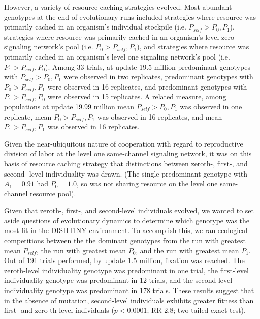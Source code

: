 However, a variety of resource-caching strategies evolved.
Most-abundant genotypes at the end of evolutionary runs included strategies where resource was primarily cached in an organism's individual stockpile (i.e. $P_{self} > P_0, P_1$), strategies where resource was primarily cached in an organism's level zero signaling network's pool (i.e. $P_0 > P_{self}, P_1$), and strategies where resource was primarily cached in an organism's level one signaling network's pool (i.e. $P_1 > P_{self}, P_0$).
Among 33 trials, at update 19.5 million predominant genotypes with $P_{self} > P_0, P_1$ were observed in two replicates, predominant genotypes with $P_0 > P_{self}, P_1$ were observed in 16 replicates, and predominant genotypes with $P_1 > P_{self}, P_0$ were observed in 15 replicates.
A related measure, among populations at update 19.99 million mean $P_{self} > P_0, P_1$ was observed in one replicate, mean $P_0 > P_{self}, P_1$ was observed in 16 replicates, and mean $P_1 > P_{self}, P_1$ was observed in 16 replicates.

Given the near-ubiquitous nature of cooperation with regard to reproductive division of labor at the level one same-channel signaling network, it was on this basis of resource caching strategy that distinctions between zeroth-, first-, and second- level individuality was drawn.
(The single predominant genotype with $A_1 = 0.91$ had $P_0 = 1.0$, so was not sharing resource on the level one same-channel resource pool).

Given that zeroth-, first-, and second-level individuals evolved, we wanted to set aside questions of evolutionary dynamics to determine which genotype was the most fit in the DISHTINY environment.
To accomplish this, we ran ecological competitions between the the dominant genotypes from the run with greatest mean $P_{self}$, the run with greatest mean $P_0$, and the run with greatest mean $P_1$.
Out of 191 trials performed, by update 1.5 million, fixation was reached.
The zeroth-level individuality genotype was predominant in one trial, the first-level individuality genotype was predominant in 12 trials, and the second-level individuality genotype was predominant in 178 trials.
These results suggest that in the absence of mutation, second-level individuals exhibits greater fitness than first- and zero-th level individuals ($p < 0.0001$; RR 2.8; two-tailed exact test).

